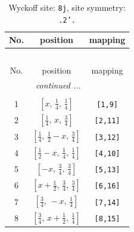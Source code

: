 \documentclass[fleqn,8pt]{jsarticle}
\begin{document}
\begin{longtable}{ccc}
\caption{Wyckoff site: {\tt 8j}, site symmetry: {\tt .2'.}}
 \\
 \hline \hline
No. & position & mapping \\ \hline \endfirsthead

\multicolumn{2}{l}{\tablename\ \thetable{}} \\
 \hline \hline
No. & position & mapping \\ \hline \endhead

 \hline \hline
\multicolumn{2}{r}{\footnotesize\it continued ...} \\ \endfoot

 \hline \hline
\multicolumn{2}{r}{} \\ \endlastfoot

1 & $\left[ x,\, \frac{1}{4},\, \frac{1}{4} \right]$ & {\tt [1,9]} \\ \hline
2 & $\left[ \frac{1}{4},\, x,\, \frac{3}{4} \right]$ & {\tt [2,11]} \\ \hline
3 & $\left[ \frac{1}{4},\, \frac{1}{2} - x,\, \frac{3}{4} \right]$ & {\tt [3,12]} \\ \hline
4 & $\left[ \frac{1}{2} - x,\, \frac{1}{4},\, \frac{1}{4} \right]$ & {\tt [4,10]} \\ \hline
5 & $\left[ - x,\, \frac{3}{4},\, \frac{3}{4} \right]$ & {\tt [5,13]} \\ \hline
6 & $\left[ x + \frac{1}{2},\, \frac{3}{4},\, \frac{3}{4} \right]$ & {\tt [6,16]} \\ \hline
7 & $\left[ \frac{3}{4},\, - x,\, \frac{1}{4} \right]$ & {\tt [7,14]} \\ \hline
8 & $\left[ \frac{3}{4},\, x + \frac{1}{2},\, \frac{1}{4} \right]$ & {\tt [8,15]} \\
\end{longtable}
\renewcommand{\arraystretch}{1.2}
\end{document}
